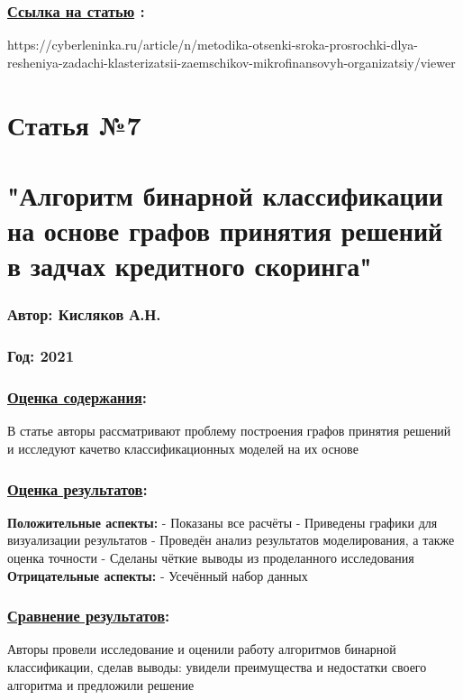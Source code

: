 \documentclass[a4paper,14pt]{article}
\begin{document}
\subsubsection*{\underline{Ссылка на статью} :}
https://cyberleninka.ru/article/n/metodika-otsenki-sroka-prosrochki-dlya-resheniya-zadachi-klasterizatsii-zaemschikov-mikrofinansovyh-organizatsiy/viewer



\newpage


\section*{Статья №7}
\section*{"Алгоритм бинарной классификации на основе графов принятия решений в задчах кредитного скоринга"}
\subsubsection*{Автор: Кисляков А.Н.}
\subsubsection*{Год: 2021}
\subsubsection*{\underline{Оценка содержания}:}
В статье авторы рассматривают проблему построения графов принятия решений и исследуют качетво классификационных моделей на их основе
\subsubsection*{\underline{Оценка результатов}:}
\textbf{Положительные аспекты:} \newline
- Показаны все расчёты \newline
- Приведены графики для визуализации результатов\newline
- Проведён анализ результатов моделирования, а также оценка точности \newline
- Сделаны чёткие выводы из проделанного исследования
\textbf{Отрицательные аспекты:} \newline
- Усечённый набор данных \newline
\subsubsection*{\underline{Сравнение результатов}:}
Авторы провели исследование и оценили работу алгоритмов бинарной классификации, сделав выводы: увидели преимущества и недостатки своего алгоритма и предложили решение
\end{document}
